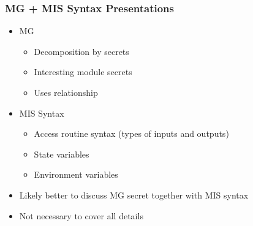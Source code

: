 \documentclass[t, 12pt, numbers, fleqn, handout]{beamer}
\begin{document}



\begin{frame}
\frametitle{MG + MIS Syntax Presentations}
\begin{itemize}
\item MG
\begin{itemize}
\item Decomposition by secrets
\item Interesting module secrets
\item Uses relationship
\end{itemize}
\item MIS Syntax
\begin{itemize}
\item Access routine syntax (types of inputs and outputs)
\item State variables
\item Environment variables
\end{itemize}
\item Likely better to discuss MG secret together with MIS syntax
\item Not necessary to cover all details
\end{itemize}
\end{frame}

\end{document}
